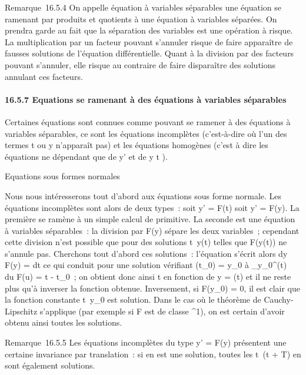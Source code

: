 Remarque~16.5.4 On appelle équation à variables séparables une équation
se ramenant par produits et quotients à une équation à variables
séparées. On prendra garde au fait que la séparation des variables est
une opération à risque. La multiplication par un facteur pouvant
s'annuler risque de faire apparaître de fausses solutions de l'équation
différentielle. Quant à la division par des facteurs pouvant s'annuler,
elle risque au contraire de faire disparaître des solutions annulant ces
facteurs.

\paragraph{16.5.7 Equations se ramenant à des équations à variables
séparables}

Certaines équations sont connues comme pouvant se ramener à des
équations à variables séparables, ce sont les équations incomplètes
(c'est-à-dire où l'un des termes t ou y n'apparaît pas) et les équations
homogènes (c'est à dire les équations ne dépendant que de y' et de  y
\over t ).

Equations sous formes normales

Nous nous intéresserons tout d'abord aux équations sous forme normale.
Les équations incomplètes sont alors de deux types~: soit y' = F(t) soit
y' = F(y). La première se ramène à un simple calcul de primitive. La
seconde est une équation à variables séparables~: la division par F(y)
sépare les deux variables~; cependant cette division n'est possible que
pour des solutions t\mapsto~y(t) telles que F(y(t))
ne s'annule pas. Cherchons tout d'abord ces solutions~: l'équation
s'écrit alors  dy \over F(y) = dt ce qui conduit pour
une solution vérifiant \phi(t_0) = y_0 à
\int  _y_0^\phi(t)~ du
\over F(u) = t - t_0~; on obtient donc ainsi t
en fonction de y = \phi(t) et il ne reste plus qu'à inverser la fonction
obtenue. Inversement, si F(y_0) = 0, il est clair que la
fonction constante t\mapsto~y_0 est
solution. Dans le cas où le théorème de Cauchy-Lipschitz s'applique (par
exemple si F est de classe ^1), on est certain d'avoir
obtenu ainsi toutes les solutions.

Remarque~16.5.5 Les équations incomplètes du type y' = F(y) présentent
une certaine invariance par translation~: si \phi en est une solution,
toutes les t\mapsto~\phi(t + T) en sont également
solutions.

